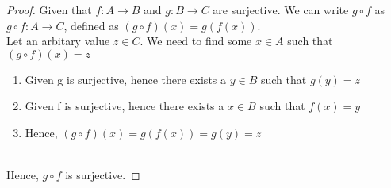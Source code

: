 \documentclass{article}
\begin{document}
\begin{proof}
    Given that $f : A \rightarrow B$ and $g : B \rightarrow C$ are surjective. 
    We can write $g \circ f$ as $g \circ f: A \rightarrow C$, defined as $(g \circ f)(x) = g(f(x))$.
    \\
    Let an arbitary value $z \in C$. We need to find some $x \in A$ such that $(g \circ f)(x) = z$
    \begin{enumerate}
        \item Given g is surjective, hence there exists a $y \in B$ such that $g(y) = z$
        \item Given f is surjective, hence there exists a $x \in B$ such that $f(x) = y$
        \item Hence, $(g \circ f)(x) = g(f(x)) = g(y) = z$
    \end{enumerate}
    \\
    Hence, $g \circ f$ is surjective.
\end{proof}
\end{document}
